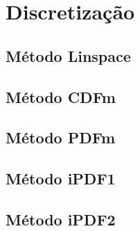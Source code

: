 \chapter{Discretização}
\section{Método Linspace} \label{cap:anexoLin}

\section{Método CDFm} \label{cap:anexoCDFm}

\section{Método PDFm} \label{cap:anexoPDFm}

\section{Método iPDF1} \label{cap:anexoiPDF1}

\section{Método iPDF2} \label{cap:anexoiPDF2}
